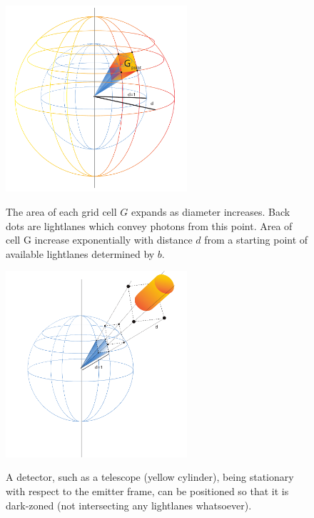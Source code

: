 \documentclass[notitlepage]{article}
\begin{document}
\begin{figure}
\centering
{\includegraphics[width=0.6\textwidth, trim={0cm 0cm 0cm 0cm},clip]{illustrations/PointEmitter.pdf}}
\caption{The area of each grid cell $G$ expands as diameter increases. Back dots are lightlanes which convey photons from this point. Area of cell G increase exponentially with distance $d$ from a starting point of available lightlanes determined by $b$.}
\label{fig:pointEmitter1}
{\includegraphics[width=0.6\textwidth, trim={0cm 0cm 0cm 0cm},clip]{illustrations/PointEmitter2.pdf}}
\caption{A detector, such as a telescope  (yellow cylinder), being stationary with respect to the emitter frame, can be positioned so that it is dark-zoned (not intersecting any lightlanes whatsoever).}
\label{fig:pointEmitter2}
\end{figure}
\end{document}
